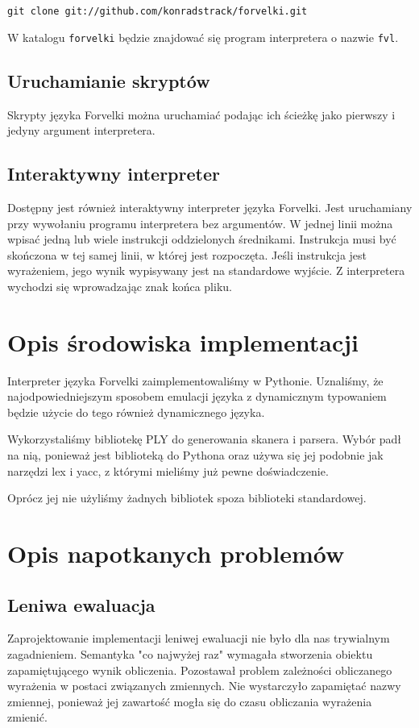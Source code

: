\documentclass[4paper,10pt]{article}
\begin{document}
	\texttt{git clone git://github.com/konradstrack/forvelki.git}
	
	W katalogu \texttt{forvelki} będzie znajdować się program interpretera o nazwie \texttt{fvl}.
	
	\subsection{Uruchamianie skryptów}	
	Skrypty języka Forvelki można uruchamiać podając ich ścieżkę jako pierwszy i jedyny argument interpretera.	
	
	\subsection{Interaktywny interpreter}
	Dostępny jest również interaktywny interpreter języka Forvelki.
	Jest uruchamiany przy wywołaniu programu interpretera bez argumentów.
	W jednej linii można wpisać jedną lub wiele instrukcji oddzielonych średnikami.
	Instrukcja musi być skończona w tej samej linii, w której jest rozpoczęta.
	Jeśli instrukcja jest wyrażeniem, jego wynik wypisywany jest na standardowe wyjście.
	Z interpretera wychodzi się wprowadzając znak końca pliku.



\section{Opis środowiska implementacji}
	Interpreter języka Forvelki zaimplementowaliśmy w Pythonie.
	Uznaliśmy, że najodpowiedniejszym sposobem emulacji języka z dynamicznym typowaniem będzie użycie do tego również dynamicznego języka.
	
	Wykorzystaliśmy bibliotekę PLY do generowania skanera i parsera.
	Wybór padł na nią, ponieważ jest biblioteką do Pythona oraz używa się jej podobnie jak narzędzi lex i yacc, z którymi mieliśmy już pewne doświadczenie.
	
	Oprócz jej nie użyliśmy żadnych bibliotek spoza biblioteki standardowej.

\section{Opis napotkanych problemów}
	\subsection{Leniwa ewaluacja}
		Zaprojektowanie implementacji leniwej ewaluacji nie było dla nas trywialnym zagadnieniem.
		Semantyka "co najwyżej raz" wymagała stworzenia obiektu zapamiętującego wynik obliczenia.
		Pozostawał problem zależności obliczanego wyrażenia w postaci związanych zmiennych.
		Nie wystarczyło zapamiętać nazwy zmiennej, ponieważ jej zawartość mogła się do czasu obliczania wyrażenia zmienić.
\end{document}
